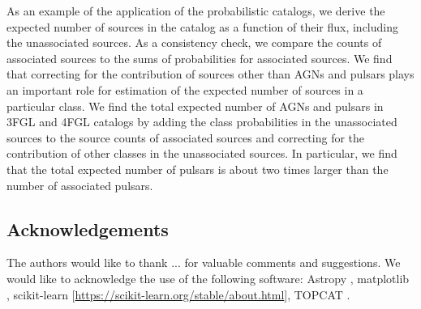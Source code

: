 As an example of the application of the probabilistic catalogs, we derive the expected number of sources in the catalog as a function of their flux, including the unassociated sources.
As a consistency check, we compare the counts of associated sources to the sums of probabilities for associated sources.
We find that correcting for the contribution of sources other than AGNs and pulsars plays an important role for estimation of the expected number of sources in a particular class.
We find the total expected number of AGNs and pulsars in 3FGL and 4FGL catalogs by adding the class probabilities in the unassociated sources to the source counts of associated sources and correcting for the contribution of other classes in the unassociated sources.
In particular, we find that the total expected number of pulsars is about two times larger than the number of associated pulsars.

\subsection*{Acknowledgements}

The authors would like to thank ...
for valuable comments and suggestions.
We would like to acknowledge the use of the following software:
Astropy \citep[\url{http://www.astropy.org},][]{2013A&A...558A..33A}, 
matplotlib \citep{Hunter:2007}, 
scikit-learn [\url{https://scikit-learn.org/stable/about.html}], 
TOPCAT \citep{2005ASPC..347...29T}.
